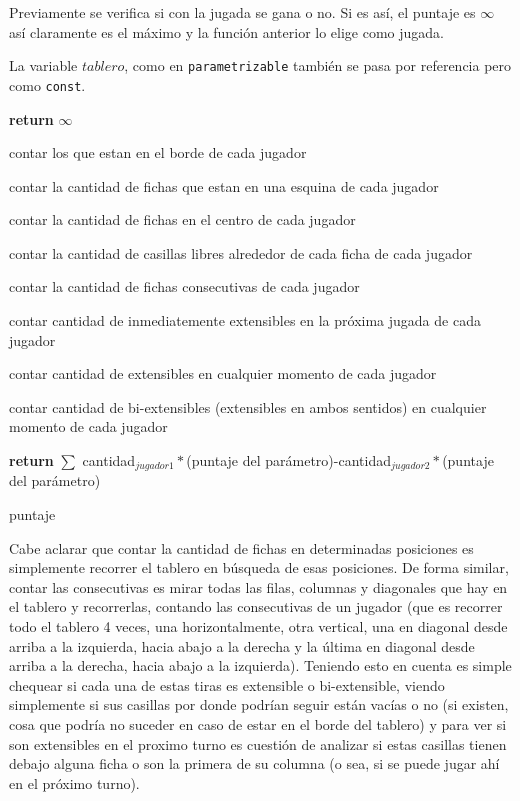 \documentclass[A4paper,oneside,fleqn,11pt]{article}
\theoremstyle{definition}
\begin{document}
Previamente se verifica si con la jugada se gana o no. Si es así, el puntaje es $\infty$ así claramente es el máximo y la función anterior lo elige como jugada.

La variable $tablero$, como en \texttt{parametrizable} también se pasa por referencia pero como \texttt{const}.
\begin{algorithm}


 

			{
			\textbf{return} $\infty$
			}    	

    	contar los que estan en el borde de cada jugador

    	contar la cantidad de fichas que estan en una esquina de cada jugador

    	contar la cantidad de fichas en el centro de cada jugador

		contar la cantidad de casillas libres alrededor de cada ficha de cada jugador

		contar la cantidad de fichas consecutivas de cada jugador

		contar cantidad de inmediatemente extensibles en la próxima jugada de cada jugador

		contar cantidad de  extensibles en cualquier momento de cada jugador

		contar cantidad de  bi-extensibles (extensibles en ambos sentidos) en cualquier momento de cada jugador

		\textbf{return} $\sum$ cantidad$_{jugador1}*$(puntaje del parámetro)-cantidad$_{jugador2}*$(puntaje del parámetro)
		
		
    \caption{puntaje}

\end{algorithm}

Cabe aclarar que contar la cantidad de fichas en determinadas posiciones es simplemente recorrer el tablero en búsqueda de esas posiciones. De forma similar, contar las consecutivas es mirar todas las filas, columnas y diagonales que hay en el tablero y recorrerlas, contando las consecutivas de un jugador (que es recorrer todo el tablero 4 veces, una horizontalmente, otra vertical, una en diagonal desde arriba a la izquierda, hacia abajo a la derecha y la última en diagonal desde arriba a la derecha, hacia abajo a la izquierda). Teniendo esto en cuenta es simple chequear si cada una de estas tiras es extensible o bi-extensible, viendo simplemente si sus casillas por donde podrían seguir están vacías o no (si existen, cosa que podría no suceder en caso de estar en el borde del tablero) y para ver si son extensibles en el proximo turno es cuestión de analizar si estas casillas tienen debajo alguna ficha o son la primera de su columna (o sea, si se puede jugar ahí en el próximo turno).
\end{document}
